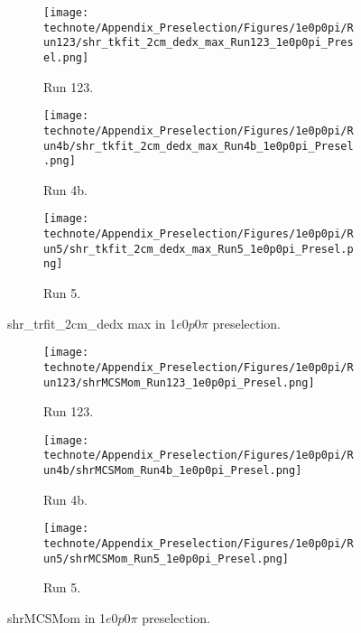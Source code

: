 \begin{figure}[H]
    \centering
    \begin{subfigure}[t]{0.32\linewidth}
        \texttt{[image: technote/Appendix\_Preselection/Figures/1e0p0pi/Run123/shr\_tkfit\_2cm\_dedx\_max\_Run123\_1e0p0pi\_Presel.png]}
        \caption{Run 123.}
    \end{subfigure}%
    \hspace{0.2cm}%
    \begin{subfigure}[t]{0.32\linewidth}
        \texttt{[image: technote/Appendix\_Preselection/Figures/1e0p0pi/Run4b/shr\_tkfit\_2cm\_dedx\_max\_Run4b\_1e0p0pi\_Presel.png]}
        \caption{Run 4b.}
    \end{subfigure}%
    \hspace{0.2cm}%
    \begin{subfigure}[t]{0.32\linewidth}
        \texttt{[image: technote/Appendix\_Preselection/Figures/1e0p0pi/Run5/shr\_tkfit\_2cm\_dedx\_max\_Run5\_1e0p0pi\_Presel.png]}
        \caption{Run 5.}
    \end{subfigure}
    \caption{shr\_trfit\_2cm\_dedx max in 1$e$0$p$0$\pi$ preselection.}
\end{figure}

\begin{figure}[H]
    \centering
    \begin{subfigure}[t]{0.32\linewidth}
        \texttt{[image: technote/Appendix\_Preselection/Figures/1e0p0pi/Run123/shrMCSMom\_Run123\_1e0p0pi\_Presel.png]}
        \caption{Run 123.}
    \end{subfigure}%
    \hspace{0.2cm}%
    \begin{subfigure}[t]{0.32\linewidth}
        \texttt{[image: technote/Appendix\_Preselection/Figures/1e0p0pi/Run4b/shrMCSMom\_Run4b\_1e0p0pi\_Presel.png]}
        \caption{Run 4b.}
    \end{subfigure}%
    \hspace{0.2cm}%
    \begin{subfigure}[t]{0.32\linewidth}
        \texttt{[image: technote/Appendix\_Preselection/Figures/1e0p0pi/Run5/shrMCSMom\_Run5\_1e0p0pi\_Presel.png]}
        \caption{Run 5.}
    \end{subfigure}
    \caption{shrMCSMom in 1$e$0$p$0$\pi$ preselection.}
\end{figure}

